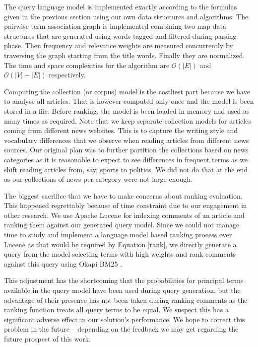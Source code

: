 \documentclass[article]{IEEEtran}
\begin{document}
The query language model is implemented exactly according to the formulas given in the previous section using our own data structures and algorithms. The pairwise term association graph is implemented combining two map data structures that are generated using words tagged and filtered during parsing phase. Then frequency and relevance weights are measured concurrently by traversing the graph starting from the title words. Finally they are normalized. The time and space complexities for the algorithm are $\mathcal{O}(|E|)$ and $\mathcal{O}(|V| + |E|)$ respectively.

Computing the collection (or corpus) model is the costliest part because we have to analyse all articles. That is however computed only once and the model is been stored in a file. Before ranking, the model is been loaded in memory and used as many times as required. Note that we keep separate collection models for articles coming from different news websites. This is to capture the writing style and vocabulary differences that we observe when reading articles from different news sources. Our original plan was to further partition the collections based on news categories as it is reasonable to expect to see differences in frequent terms as we shift reading articles from, say, sports to politics. We did not do that at the end as our collections of news per category were not large enough.     

The biggest sacrifice that we have to make concerns about ranking evaluation. This happened regrettably because of time constraint due to our engagement in other research. We use Apache Lucene \cite{McCandless:2010:LAS:1893016} for indexing comments of an article and ranking them against our generated query model. Since we could not manage time to study and implement a language model based ranking process over Lucene as that would be required by Equation \ref{rank}, we directly generate a query from the model selecting terms with high weights and rank comments against this query using Okapi BM25 \cite{Robertson96okapiat}.

This adjustment has the shortcoming that the probabilities for principal terms available in the query model have been used during query generation, but the advantage of their presence has not been taken during ranking comments as the ranking function treats all query terms to be equal. We suspect this has a significant adverse effect in our solution's performance. We hope to correct this problem in the future -- depending on the feedback we may get regarding the future prospect of this work.          
\end{document}
